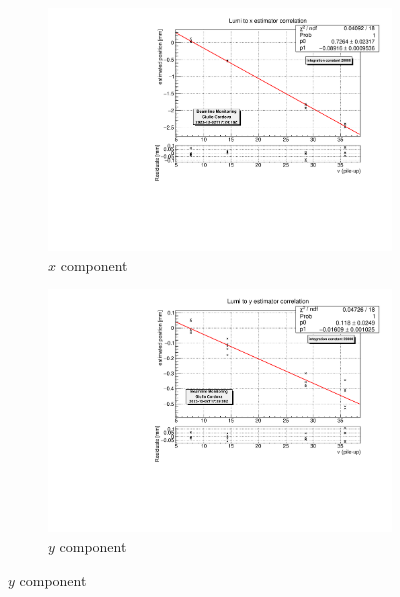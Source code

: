 \begin{figure}
    \centering
    \begin{subfigure}{0.6\textwidth}
    \centering
    \includegraphics[width=\linewidth]{figures/x_to_lumi_fit_20000.pdf}
    \caption{$x$ component}
    \label{fig:x_to_lumi}
    \end{subfigure}%
    
    \begin{subfigure}{0.6\textwidth}
    \centering
    \includegraphics[width=\linewidth]{figures/y_to_lumi_fit_20000.pdf}
    \caption{$y$ component}
    \label{fig:y_to_lumi}
    \end{subfigure}%
    

\end{figure}

